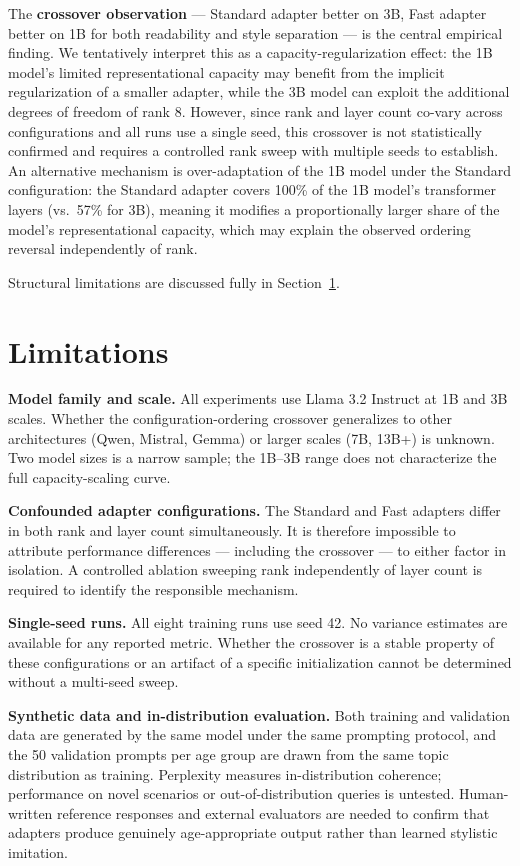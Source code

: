 \documentclass[journal]{IEEEtai}
\begin{document}
The \textbf{crossover observation} --- Standard adapter better on 3B, Fast adapter better on 1B for both readability and style separation --- is the central empirical finding. We tentatively interpret this as a capacity-regularization effect: the 1B model's limited representational capacity may benefit from the implicit regularization of a smaller adapter, while the 3B model can exploit the additional degrees of freedom of rank 8. However, since rank and layer count co-vary across configurations and all runs use a single seed, this crossover is not statistically confirmed and requires a controlled rank sweep with multiple seeds to establish. An alternative mechanism is over-adaptation of the 1B model under the Standard configuration: the Standard adapter covers 100\% of the 1B model's transformer layers (vs.\ 57\% for 3B), meaning it modifies a proportionally larger share of the model's representational capacity, which may explain the observed ordering reversal independently of rank.

Structural limitations are discussed fully in Section~\ref{sec:limitations}.

\section{Limitations}\label{sec:limitations}

\textbf{Model family and scale.} All experiments use Llama 3.2 Instruct at 1B and 3B scales. Whether the configuration-ordering crossover generalizes to other architectures (Qwen, Mistral, Gemma) or larger scales (7B, 13B+) is unknown. Two model sizes is a narrow sample; the 1B--3B range does not characterize the full capacity-scaling curve.

\textbf{Confounded adapter configurations.} The Standard and Fast adapters differ in both rank and layer count simultaneously. It is therefore impossible to attribute performance differences --- including the crossover --- to either factor in isolation. A controlled ablation sweeping rank independently of layer count is required to identify the responsible mechanism.

\textbf{Single-seed runs.} All eight training runs use seed 42. No variance estimates are available for any reported metric. Whether the crossover is a stable property of these configurations or an artifact of a specific initialization cannot be determined without a multi-seed sweep.

\textbf{Synthetic data and in-distribution evaluation.} Both training and validation data are generated by the same model under the same prompting protocol, and the 50 validation prompts per age group are drawn from the same topic distribution as training. Perplexity measures in-distribution coherence; performance on novel scenarios or out-of-distribution queries is untested. Human-written reference responses and external evaluators are needed to confirm that adapters produce genuinely age-appropriate output rather than learned stylistic imitation.
\end{document}
